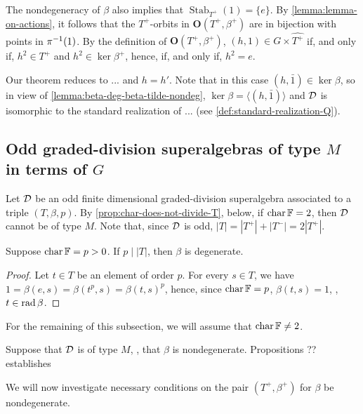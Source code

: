 The nondegeneracy of $\beta$ also implies that $\operatorname{Stab}_{T^+} (1) = \{e \}$. 
By \cref{lemma:lemma-on-actions}, it follows that the $T^+$-orbits in $\mathbf {O} (T^+, \beta^+)$ are in bijection with points in $\pi^{-1} (1)$. 
By the definition of $\mathbf {O} (T^+, \beta^+)$, $(h, 1) \in G \times \widehat{T^+}$ if, and only if, $h^2 \in T^+$ and $h^2 \in \ker \beta^+$, hence, if, and only if, $h^2 = e$. 

Our theorem reduces to ... and $h = h'$. 
Note that in this case $(h, \bar 1) \in \ker \beta$, so in view of \cref{lemma:beta-deg-beta-tilde-nondeg}, $\ker \beta = \langle (h, \bar 1) \rangle$ and $\mathcal{D}$ is isomorphic to the standard realization of ... (see \cref{def:standard-realization-Q}).

\subsection{Odd graded-division superalgebras of type \texorpdfstring{$M$}{M} in terms of \texorpdfstring{$G$}{M}}

Let $\mathcal{D}$ be an odd finite dimensional graded-division superalgebra associated to a triple $(T, \beta, p)$. 
By \cref{prop:char-does-not-divide-T}, below, if $\operatorname{char} \mathbb{F} = 2$, then $\mathcal{D}$ cannot be of type $M$. 
Note that, since $\mathcal{D}$ is odd, $|T| = |T^+| + |T^-| = 2|T^+|$.

\begin{prop}\label{prop:char-does-not-divide-T}
    Suppose $\operatorname{char} \mathbb{F} = p > 0$. 
    If $p \mid |T|$, then $\beta$ is degenerate.
\end{prop}

\begin{proof}
    Let $t\in T$ be an element of order $p$. 
    For every $s\in T$, we have $1 = \beta(e, s) = \beta(t^p, s) = \beta(t, s)^p$, hence, since $\operatorname{char} \mathbb{F} = p$, $\beta(t, s) = 1$, \ie, $t\in \operatorname{rad} \beta$. 
\end{proof}
 
For the remaining of this subsection, we will assume that $\operatorname{char} \mathbb{F} \neq 2$.

Suppose that $\mathcal{D}$ is of type $M$, \ie, that $\beta$ is nondegenerate. 
Propositions ?? establishes

We will now investigate necessary conditions on the pair $(T^+, \beta^+)$ for $\beta$ be nondegenerate. 


